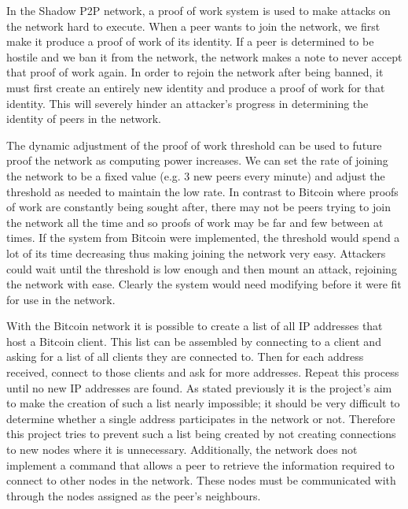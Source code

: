 \documentclass[ %
                    author={Luke Murray},
                supervisor={Dr. Simon Hollis},
                     title={Shadow Peer-to-Peer Networks},
                  subtitle={},
                    degree={MEng},
                      year={2013} ]{thesis}
\begin{document}
In the Shadow P2P network, a proof of work system is used to make attacks on the network hard to execute. When a peer wants to join the network, we first make it produce a proof of work of its identity. If a peer is determined to be hostile and we ban it from the network, the network makes a note to never accept that proof of work again. In order to rejoin the network after being banned, it must first create an entirely new identity and produce a proof of work for that identity. This will severely hinder an attacker's progress in determining the identity of peers in the network.

The dynamic adjustment of the proof of work threshold can be used to future proof the network as computing power increases. We can set the rate of joining the network to be a fixed value (e.g. 3 new peers every minute) and adjust the threshold as needed to maintain the low rate. In contrast to Bitcoin where proofs of work are constantly being sought after, there may not be peers trying to join the network all the time and so proofs of work may be far and few between at times. If the system from Bitcoin were implemented, the threshold would spend a lot of its time decreasing thus making joining the network very easy. Attackers could wait until the threshold is low enough and then mount an attack, rejoining the network with ease. Clearly the system would need modifying before it were fit for use in the network.

With the Bitcoin network it is possible to create a list of all IP addresses that host a Bitcoin client. This list can be assembled by connecting to a client and asking for a list of all clients they are connected to. Then for each address received, connect to those clients and ask for more addresses. Repeat this process until no new IP addresses are found. As stated previously it is the project's aim to make the creation of such a list nearly impossible; it should be very difficult to determine whether a single address participates in the network or not. Therefore this project tries to prevent such a list being created by not creating connections to new nodes where it is unnecessary. Additionally, the network does not implement a command that allows a peer to retrieve the information required to connect to other nodes in the network. These nodes must be communicated with through the nodes assigned as the peer's neighbours.

\end{document}
